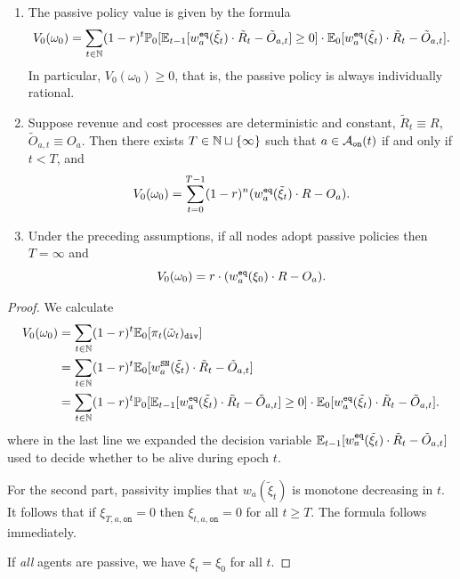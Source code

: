 \begin{proposition}
\label{thm:passive-policy-value}
  \begin{enumerate}
    \item
      The passive policy value is given by the formula
      \[
        V_0(\omega_0) = \sum_{t\in\mathbb{N}}(1-r)^t  \mathbb{P}_0[\mathbb{E}_{t-1}[w^{\mathtt{eq}}_a(\tilde\xi_t)\cdot \tilde R_t - \tilde{O}_{a,t}] \geq 0]  \cdot \mathbb{E}_0[ w_a^{\mathtt{eq}}(\tilde\xi_t)\cdot \tilde R_t - \tilde{O}_{a,t} ].
      \]
      In particular, $V_0(\omega_0)\geq 0$, that is, the passive policy is always individually rational.

    \item
      Suppose revenue and cost processes are deterministic and constant, $\tilde{R}_t\equiv R$, $\tilde{O}_{a,t}\equiv O_a$.
      Then there exists $T\in \mathbb{N}\sqcup\{\infty\}$ such that $a\in\mathcal{A}_{\mathtt{on}}(t)$ if and only if $t < T$, and
      \[  
        V_0(\omega_0) = \sum_{t=0}^{T-1}(1-r)^n (w_a^{\mathtt{eq}}(\tilde\xi_t)\cdot R - O_a).
      \]

    \item
      Under the preceding assumptions, if all nodes adopt passive policies then $T=\infty$ and
      \[
        V_0(\omega_0) = r\cdot (w_a^{\mathtt{eq}}(\xi_0)\cdot R - O_a).
      \]
  \end{enumerate}
\end{proposition}
%
\begin{proof}

  We calculate
  \begin{align*}
    V_0(\omega_0) &= \sum_{t\in\mathbb{N}}(1-r)^t \mathbb{E}_0[\pi_t(\tilde\omega_t)_\mathtt{div} ] \\
    &= \sum_{t\in\mathbb{N}}(1-r)^t  \mathbb{E}_0[ w_a^\mathtt{SN}(\tilde\xi_t)\cdot \tilde R_t - \tilde{O}_{a,t} ] \\
      &= \sum_{t\in\mathbb{N}}(1-r)^t  \mathbb{P}_0[\mathbb{E}_{t-1}[w_a^{\mathtt{eq}}(\tilde\xi_t)\cdot \tilde R_t - \tilde{O}_{a,t}] \geq 0]  \cdot \mathbb{E}_0[ w_a^{\mathtt{eq}}(\tilde\xi_t)\cdot \tilde R_t - \tilde{O}_{a,t} ].
  \end{align*}
  where in the last line we expanded the decision variable $\mathbb{E}_{t-1}[w_a^{\mathtt{eq}}(\tilde\xi_t)\cdot \tilde R_t - \tilde{O}_{a,t}]$ used to decide whether to be alive during epoch $t$.

  For the second part, passivity implies that $w_a(\tilde \xi_t)$ is monotone decreasing in $t$.
  It follows that if $\xi_{T,a,\mathtt{on}}=0$ then $\xi_{t,a,\mathtt{on}}=0$ for all $t\geq T$.
  The formula follows immediately.

  If \emph{all} agents are passive, we have $\xi_t=\xi_0$ for all $t$. \qedhere

\end{proof}

